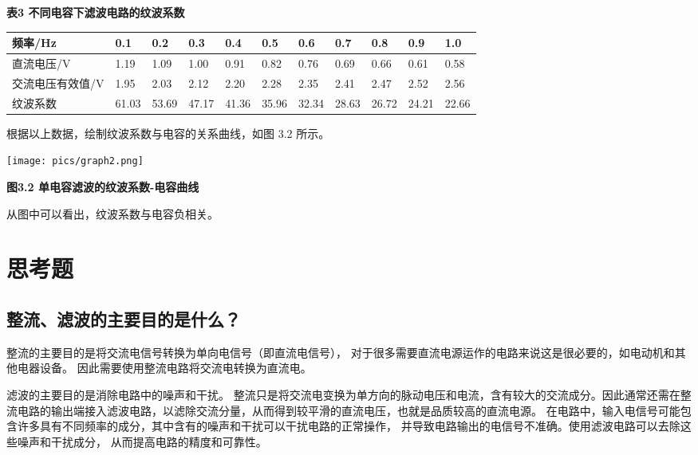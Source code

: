 \documentclass[10pt,a4paper]{article}	%
\makeatletter
\newenvironment{figurehere}
{\def\@captype{figure}}
{}
\newenvironment{tablehere}
{\def\@captype{table}}
{}
\makeatother
\begin{document}
		\begin{tablehere}
			\caption*{\bf 表3 不同电容下滤波电路的纹波系数}
			\noindent
			\begin{center}
			\begin{tabular}{|l|l|l|l|l|l|l|l|l|l|l|}
				\hline
				频率/Hz     & 0.1   & 0.2   & 0.3   & 0.4   & 0.5   & 0.6   & 0.7   & 0.8   & 0.9   & 1.0   \\ \hline
				直流电压/V    & 1.19  & 1.09  & 1.00  & 0.91  & 0.82  & 0.76  & 0.69  & 0.66  & 0.61  & 0.58  \\ \hline
				交流电压有效值/V & 1.95  & 2.03  & 2.12  & 2.20  & 2.28  & 2.35  & 2.41  & 2.47  & 2.52  & 2.56  \\ \hline
				纹波系数      & 61.03 & 53.69 & 47.17 & 41.36 & 35.96 & 32.34 & 28.63 & 26.72 & 24.21 & 22.66 \\ \hline
			\end{tabular}
			\end{center}
			\vspace*{1em}
		\end{tablehere}

		\newpage
		根据以上数据，绘制纹波系数与电容的关系曲线，如图 3.2 所示。

		\begin{figurehere}
			\vspace*{0.3em}
			\centering
			\texttt{[image: pics/graph2.png]}
			\caption*{\bf 图3.2 单电容滤波的纹波系数-电容曲线}
			\vspace*{0.8em}
		\end{figurehere}
		
		从图中可以看出，纹波系数与电容负相关。

	\section{思考题}
		\subsection{整流、滤波的主要目的是什么？}

		整流的主要目的是将交流电信号转换为单向电信号（即直流电信号），
		对于很多需要直流电源运作的电路来说这是很必要的，如电动机和其他电器设备。
		因此需要使用整流电路将交流电转换为直流电。

		滤波的主要目的是消除电路中的噪声和干扰。
		整流只是将交流电变换为单方向的脉动电压和电流，含有较大的交流成分。因此通常还需在整流电路的输出端接入滤波电路，以滤除交流分量，从而得到较平滑的直流电压，也就是品质较高的直流电源。
		在电路中，输入电信号可能包含许多具有不同频率的成分，其中含有的噪声和干扰可以干扰电路的正常操作，
		并导致电路输出的电信号不准确。使用滤波电路可以去除这些噪声和干扰成分，
		从而提高电路的精度和可靠性。
\end{document}
